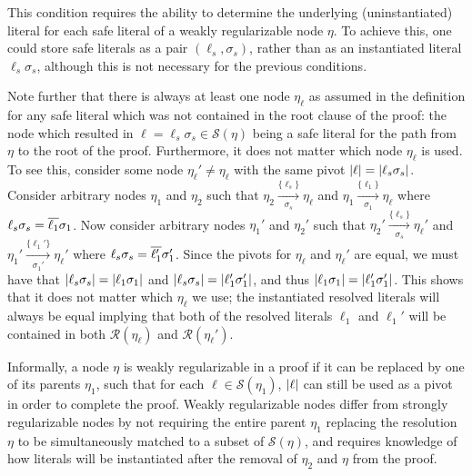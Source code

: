 This condition requires the ability to determine the underlying (uninstantiated) literal for each safe literal of a weakly regularizable node $\eta$. To achieve this, one could store safe literals as a pair $(\ell_s,\sigma_s)$, rather than as an instantiated literal $\ell_s\sigma_s$, although this is not necessary for the previous conditions.

Note further that there is always at least one node $\eta_\ell$ as assumed in the definition for any safe literal which was not contained in the root clause of the proof: the node which resulted in $\ell = \ell_s\sigma_s \in \mathcal{S}(\eta)$ being a safe literal for the path from $\eta$ to the root of the proof. Furthermore, it does not matter which node $\eta_\ell$ is used. To see this, consider some node $\eta_\ell' \neq \eta_\ell$ with the same pivot $\lvert\ell\rvert=\lvert\ell_s\sigma_s\rvert$. Consider arbitrary nodes $\eta_1$ and $\eta_2$ such that  $\eta_2 \xrightarrow[\sigma_s]{\{\ell_s\} } \eta_\ell$ and $\eta_1 \xrightarrow[\sigma_1]{\{\ell_1\} } \eta_\ell$ where $\ell_s\sigma_s=\overline{\ell_1}\sigma_1$. Now consider arbitrary nodes $\eta_1'$ and $\eta_2'$ such that  $\eta_2' \xrightarrow[\sigma_s]{\{\ell_s\} } \eta_\ell'$ and $\eta_1' \xrightarrow[\sigma_1']{\{\ell_1'\} } \eta_\ell'$ where $\ell_s\sigma_s=\overline{\ell_1'}\sigma_1'$. Since the pivots for $\eta_\ell$ and $\eta_\ell'$ are equal, we must have that %
$\lvert\ell_s\sigma_s\rvert=\lvert\ell_1\sigma_1\rvert$ and $\lvert\ell_s\sigma_s\rvert=\lvert\ell_1'\sigma_1'\rvert$, and thus $\lvert\ell_1\sigma_1\rvert=\lvert\ell_1'\sigma_1'\rvert$. This shows that it does not matter which $\eta_\ell$ we use; the instantiated resolved literals will always be equal implying that both of the resolved literals $\ell_1$ and $\ell_1'$ will be contained in both $\mathcal{R}(\eta_\ell)$ and $\mathcal{R}(\eta_\ell')$.


Informally, a node $\eta$ is weakly regularizable in a proof if it can be replaced by one of its parents $\eta_1$, such that for each $\ell \in \mathcal{S}(\eta_1)$, $\lvert\ell\rvert$ can still be used as a pivot in order to complete the proof. Weakly regularizable nodes differ from strongly regularizable nodes by not requiring the entire parent $\eta_1$ replacing the resolution $\eta$ to be simultaneously matched to a subset of $\mathcal{S}(\eta)$, and requires knowledge of how literals will be instantiated after the removal of $\eta_2$ and $\eta$ from the proof.



